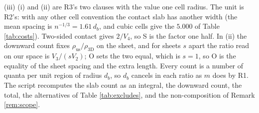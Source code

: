 (iii) (i) and (ii) are R3's two clauses with the value one cell radius. The unit is R2's: with any other cell convention the contact slab has another width (the mean spacing is $n^{-1/3} = 1.61\,d_{b}$, and cubic cells give the $5.000$ of Table \ref{tab:costs}). Two-sided contact gives $2/V_{4}$, so S is the factor one half. In (ii) the downward count fixes $\rho_{\mathrm{us}}/\rho_{3\mathrm{D}}$ on the sheet, and for sheets $s$ apart the ratio read on our space is $V_{3}/(sV_{2})$; O sets the two equal, which is $s = 1$, so O is the equality of the sheet spacing and the extra length. Every count is a number of quanta per unit region of radius $d_{b}$, so $d_{b}$ cancels in each ratio as $m$ does by R1. The script recomputes the slab count as an integral, the downward count, the total, the alternatives of Table \ref{tab:excludes}, and the non-composition of Remark \ref{rem:scope}.
